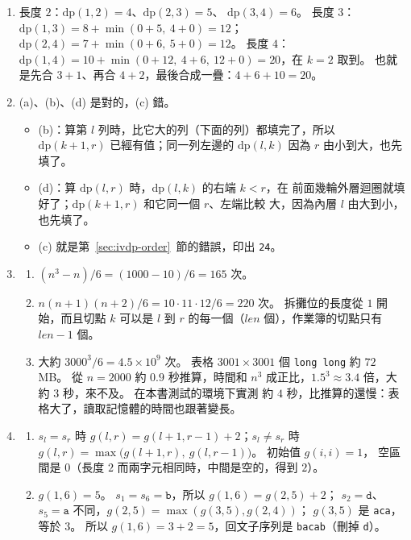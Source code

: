 \begin{enumerate}
\item 長度 $2$：$\mathrm{dp}(1, 2) = 4$、$\mathrm{dp}(2, 3) = 5$、
$\mathrm{dp}(3, 4) = 6$。 長度 $3$：$\mathrm{dp}(1, 3) = 8 + \min(0 + 5,\ 4 + 0) = 12$；
$\mathrm{dp}(2, 4) = 7 + \min(0 + 6,\ 5 + 0) = 12$。 長度 $4$：
$\mathrm{dp}(1, 4) = 10 + \min(0 + 12,\ 4 + 6,\ 12 + 0) = 20$，在 $k = 2$ 取到。
也就是先合 $3 + 1$、再合 $4 + 2$，最後合成一疊：$4 + 6 + 10 = 20$。

\item (a)、(b)、(d) 是對的，(c) 錯。
\begin{itemize}
\item (b)：算第 $l$ 列時，比它大的列（下面的列）都填完了，所以
$\mathrm{dp}(k + 1, r)$ 已經有值；同一列左邊的 $\mathrm{dp}(l, k)$ 因為
$r$ 由小到大，也先填了。
\item (d)：算 $\mathrm{dp}(l, r)$ 時，$\mathrm{dp}(l, k)$ 的右端 $k < r$，在
前面幾輪外層迴圈就填好了；$\mathrm{dp}(k + 1, r)$ 和它同一個 $r$、左端比較
大，因為內層 $l$ 由大到小，也先填了。
\item (c) 就是第~\ref{sec:ivdp-order}~節的錯誤，印出 \texttt{24}。
\end{itemize}

\item
\begin{enumerate}
\item $(n^3 - n)/6 = (1000 - 10)/6 = 165$ 次。
\item $n(n + 1)(n + 2)/6 = 10 \cdot 11 \cdot 12 / 6 = 220$ 次。 拆攤位的長度從
$1$ 開始，而且切點 $k$ 可以是 $l$ 到 $r$ 的每一個（$len$ 個），作業簿的切點只有
$len - 1$ 個。
\item 大約 $3000^3 / 6 = 4.5 \times 10^9$ 次。 表格 $3001 \times 3001$ 個
\texttt{long long} 約 $72$ MB。 從 $n = 2000$ 約 $0.9$ 秒推算，時間和 $n^3$
成正比，$1.5^3 \approx 3.4$ 倍，大約 $3$ 秒，來不及。 在本書測試的環境下實測
約 $4$ 秒，比推算的還慢：表格大了，讀取記憶體的時間也跟著變長。
\end{enumerate}

\item
\begin{enumerate}
\item $s_l = s_r$ 時 $g(l, r) = g(l + 1, r - 1) + 2$；$s_l \ne s_r$ 時
$g(l, r) = \max\bigl(g(l + 1, r),\ g(l, r - 1)\bigr)$。 初始值 $g(i, i) = 1$，
空區間是 $0$（長度 $2$ 而兩字元相同時，中間是空的，得到 $2$）。
\item $g(1, 6) = 5$。 $s_1 = s_6 = \texttt{b}$，所以 $g(1, 6) = g(2, 5) + 2$；
$s_2 = \texttt{d}$、$s_5 = \texttt{a}$ 不同，$g(2, 5) = \max(g(3, 5), g(2, 4))$；
$g(3, 5)$ 是 \texttt{aca}，等於 $3$。 所以 $g(1, 6) = 3 + 2 = 5$，回文子序列是
\texttt{bacab}（刪掉 \texttt{d}）。
\end{enumerate}


\end{enumerate}
